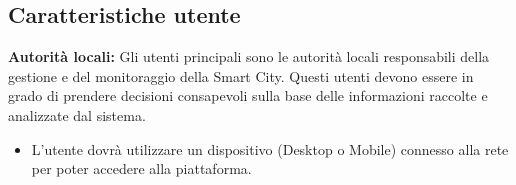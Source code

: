\subsection{Caratteristiche utente}
\textbf{Autorità locali:} Gli utenti principali sono le autorità locali responsabili della gestione e del monitoraggio della Smart City. Questi utenti devono essere in grado di prendere decisioni consapevoli sulla base delle informazioni raccolte e analizzate dal sistema.
\begin{itemize}
    \item L'utente dovrà utilizzare un dispositivo (Desktop o Mobile) connesso alla rete per poter accedere alla piattaforma.  
\end{itemize}
